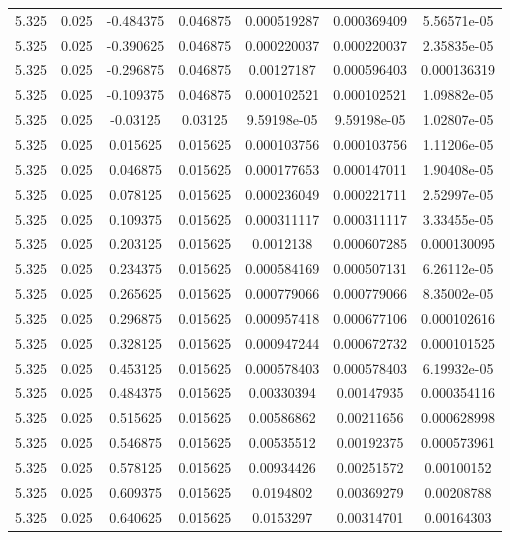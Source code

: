 \begin{table}[bh]
\begin{center}
{\begin{tabular}{ccccccc}
5.325	 & 0.025 & 	-0.484375	 & 0.046875	 & 0.000519287	 & 0.000369409	 & 5.56571e-05 \\ 
5.325	 & 0.025 & 	-0.390625	 & 0.046875	 & 0.000220037	 & 0.000220037	 & 2.35835e-05 \\ 
5.325	 & 0.025 & 	-0.296875	 & 0.046875	 & 0.00127187	 & 0.000596403	 & 0.000136319 \\ 
5.325	 & 0.025 & 	-0.109375	 & 0.046875	 & 0.000102521	 & 0.000102521	 & 1.09882e-05 \\ 
5.325	 & 0.025 & 	-0.03125	 & 0.03125	 & 9.59198e-05	 & 9.59198e-05	 & 1.02807e-05 \\ 
5.325	 & 0.025 & 	0.015625	 & 0.015625	 & 0.000103756	 & 0.000103756	 & 1.11206e-05 \\ 
5.325	 & 0.025 & 	0.046875	 & 0.015625	 & 0.000177653	 & 0.000147011	 & 1.90408e-05 \\ 
5.325	 & 0.025 & 	0.078125	 & 0.015625	 & 0.000236049	 & 0.000221711	 & 2.52997e-05 \\ 
5.325	 & 0.025 & 	0.109375	 & 0.015625	 & 0.000311117	 & 0.000311117	 & 3.33455e-05 \\ 
5.325	 & 0.025 & 	0.203125	 & 0.015625	 & 0.0012138	 & 0.000607285	 & 0.000130095 \\ 
5.325	 & 0.025 & 	0.234375	 & 0.015625	 & 0.000584169	 & 0.000507131	 & 6.26112e-05 \\ 
5.325	 & 0.025 & 	0.265625	 & 0.015625	 & 0.000779066	 & 0.000779066	 & 8.35002e-05 \\ 
5.325	 & 0.025 & 	0.296875	 & 0.015625	 & 0.000957418	 & 0.000677106	 & 0.000102616 \\ 
5.325	 & 0.025 & 	0.328125	 & 0.015625	 & 0.000947244	 & 0.000672732	 & 0.000101525 \\ 
5.325	 & 0.025 & 	0.453125	 & 0.015625	 & 0.000578403	 & 0.000578403	 & 6.19932e-05 \\ 
5.325	 & 0.025 & 	0.484375	 & 0.015625	 & 0.00330394	 & 0.00147935	 & 0.000354116 \\ 
5.325	 & 0.025 & 	0.515625	 & 0.015625	 & 0.00586862	 & 0.00211656	 & 0.000628998 \\ 
5.325	 & 0.025 & 	0.546875	 & 0.015625	 & 0.00535512	 & 0.00192375	 & 0.000573961 \\ 
5.325	 & 0.025 & 	0.578125	 & 0.015625	 & 0.00934426	 & 0.00251572	 & 0.00100152 \\ 
5.325	 & 0.025 & 	0.609375	 & 0.015625	 & 0.0194802	 & 0.00369279	 & 0.00208788 \\ 
5.325	 & 0.025 & 	0.640625	 & 0.015625	 & 0.0153297	 & 0.00314701	 & 0.00164303 \\ 

\end{tabular}}
\end{center}
\end{table}

